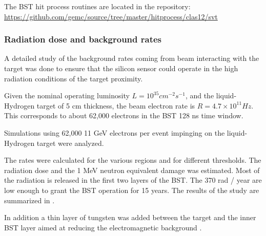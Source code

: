 The BST hit process routines are located in the repository: \url{https://github.com/gemc/source/tree/master/hitprocess/clas12/svt}

\subsubsection{Radiation dose and background rates}
A detailed study of the background rates coming from beam interacting with the target was done to ensure that the silicon sensor
could operate in the high radiation conditions of the target proximity.

Given the nominal operating luminosity $L=10^{35} cm^{-2}s^{-1}$, and the liquid-Hydrogen target of 5 cm thickness, the beam electron rate
is $R=4.7 \times 10^{11} Hz$. This corresponds to about 62,000 electrons in the BST 128 ns time window.

Simulations using 62,000 11 GeV electrons per event impinging on the liquid-Hydrogen target were analyzed.

The rates were calculated for the various regions and for different thresholds.
The radiation dose and the 1 MeV neutron equivalent damage was estimated. Most of the radiation
is released in the first two layers of the BST.
The 370 rad / year are low enough to grant the BST operation for 15 years. The results of the study
are summarized in .

In addition a thin layer of tungsten was added between the target and the inner BST layer aimed at reducing the electromagnetic
background \cite{bstDose}.

